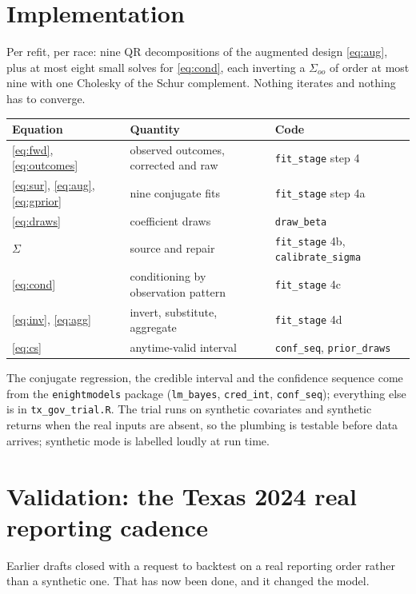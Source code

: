 \documentclass[11pt]{article}
\begin{document}
\section{Implementation}\label{sec:impl}

Per refit, per race: nine QR decompositions of the augmented design \eqref{eq:aug}, plus at
most eight small solves for \eqref{eq:cond}, each inverting a $\Sigma_{oo}$ of order at most
nine with one Cholesky of the Schur complement. Nothing iterates and nothing has to
converge.

\begin{table}[ht]
\centering
\small
\begin{tabular}{lll}
\toprule
Equation & Quantity & Code \\
\midrule
\eqref{eq:fwd}, \eqref{eq:outcomes} & observed outcomes, corrected and raw & \texttt{fit\_stage} step 4 \\
\eqref{eq:sur}, \eqref{eq:aug}, \eqref{eq:gprior} & nine conjugate fits & \texttt{fit\_stage} step 4a \\
\eqref{eq:draws} & coefficient draws & \texttt{draw\_beta} \\
$\Sigma$ & source and repair & \texttt{fit\_stage} 4b, \texttt{calibrate\_sigma} \\
\eqref{eq:cond} & conditioning by observation pattern & \texttt{fit\_stage} 4c \\
\eqref{eq:inv}, \eqref{eq:agg} & invert, substitute, aggregate & \texttt{fit\_stage} 4d \\
\eqref{eq:cs} & anytime-valid interval & \texttt{conf\_seq}, \texttt{prior\_draws} \\
\bottomrule
\end{tabular}
\end{table}

\noindent The conjugate regression, the credible interval and the confidence sequence come
from the \texttt{enightmodels} package (\texttt{lm\_bayes}, \texttt{cred\_int},
\texttt{conf\_seq}); everything else is in \texttt{tx\_gov\_trial.R}. The trial runs on
synthetic covariates and synthetic returns when the real inputs are absent, so the
plumbing is testable before data arrives; synthetic mode is labelled loudly at run time.

\section{Validation: the Texas 2024 real reporting cadence}\label{sec:valid}

Earlier drafts closed with a request to backtest on a real reporting order rather than a
synthetic one. That has now been done, and it changed the model.
\end{document}
